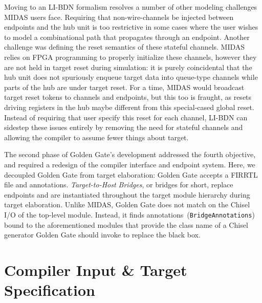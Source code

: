 Moving to an LI-BDN formalism resolves a number of other modeling
challenges MIDAS users face.  Requiring that non-wire-channels be injected
between endpoints and the hub unit is too restrictive in some cases where
the user wishes to model a combinational path that propagates through an
endpoint. Another challenge was defining the reset semantics of these
stateful channels.  MIDAS relies on FPGA programming to properly initialize
these channels, however they are not held in target reset during
simulation: it is purely coincidental that the hub unit does not
spuriously enqueue target data into queue-type channels while parts of the
hub are under target reset. For a time, MIDAS would broadcast target reset
tokens to channels and endpoints, but this too is fraught, as resets driving
registers in the hub maybe different from this special-cased global reset.
Instead of requiring that user specify this reset for each channel, LI-BDN
can sidestep these issues entirely by removing the need for stateful
channels and allowing the compiler to assume fewer things about target.

The second phase of Golden Gate's development addressed the fourth objective,
and required a redesign of the compiler interface and endpoint system. Here, we
decoupled Golden Gate from target elaboration: Golden Gate accepts a FIRRTL
file and annotations. \emph{Target-to-Host Bridges}, or bridges for
short, replace endpoints and are instantiated throughout the target module
hierarchy during target elaboration. Unlike MIDAS, Golden Gate does not match
on the Chisel I/O of the top-level module. Instead, it finds annotations~(\texttt{BridgeAnnotations}) bound to the aforementioned modules that provide the
class name of a Chisel generator Golden Gate should invoke to replace the black
box.

\section{Compiler Input \& Target Specification}

